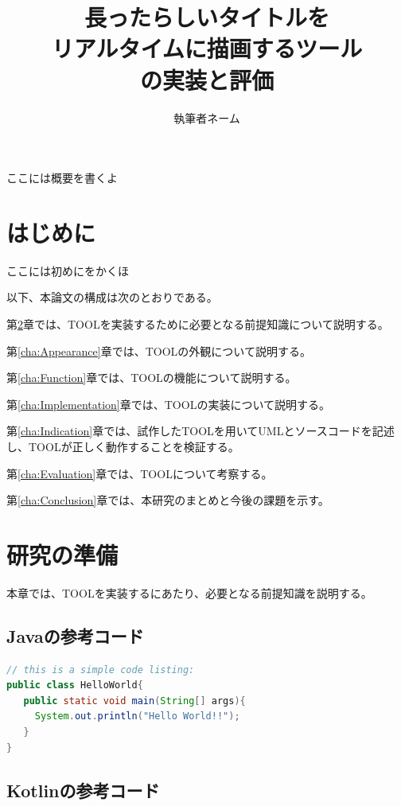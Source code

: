 \documentclass[uplatex, report, a4j, 10pt, dvipdfmx]{jsbook}
\title{長ったらしいタイトルを \\ リアルタイムに描画するツール \\ \tool{}の実装と評価}
\author{執筆者ネーム}
\newcommand{\tool}{TOOL}
\begin{document}
\maketitle


ここには概要を書くよ


%
\chapter{はじめに}\label{cha:Introduction}

ここには初めにをかくほ

以下、本論文の構成は次のとおりである。

第\ref{cha:Preparation}章では、\tool{}を実装するために必要となる前提知識について説明する。

第\ref{cha:Appearance}章では、\tool{}の外観について説明する。

第\ref{cha:Function}章では、\tool{}の機能について説明する。

第\ref{cha:Implementation}章では、\tool{}の実装について説明する。

第\ref{cha:Indication}章では、試作した\tool{}を用いてUMLとソースコードを記述し、\tool{}が正しく動作することを検証する。

第\ref{cha:Evaluation}章では、\tool{}について考察する。

第\ref{cha:Conclusion}章では、本研究のまとめと今後の課題を示す。



\chapter{研究の準備}\label{cha:Preparation}

本章では、\tool{}を実装するにあたり、必要となる前提知識を説明する\cite{hirakoba, sqbok, vdmj}。
\section{Javaの参考コード}

\begin{lstlisting}[caption={Javaの参考コード}, label={lst:example_java}, language=Java]
// this is a simple code listing:
public class HelloWorld{
   public static void main(String[] args){
     System.out.println("Hello World!!");
   }
}
\end{lstlisting}

\section{Kotlinの参考コード}
\end{document}
